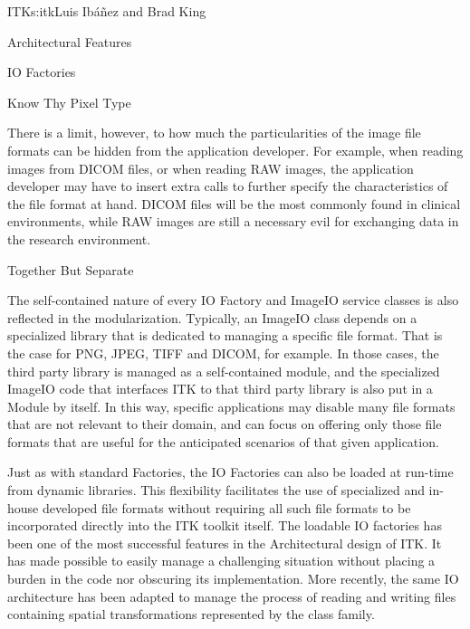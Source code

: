 \begin{aosachapter}{ITK}{s:itk}{Luis Ib\'{a}\~{n}ez and Brad King}
\begin{aosasect1}{Architectural Features}
\begin{aosasect2}{IO Factories}
\begin{aosasect3}{Know Thy Pixel Type}
\begin{aosaitemize}
\item {}
\item {}
\item {}
\item {}
\end{aosaitemize}

There is a limit, however, to how much the particularities of the image file
formats can be hidden from the application developer.  For example, when
reading images from DICOM files, or when reading RAW images, the application
developer may have to insert extra calls to further specify the characteristics
of the file format at hand. DICOM files will be the most commonly found in
clinical environments, while RAW images are still a necessary evil for
exchanging data in the research environment.

\end{aosasect3}

\begin{aosasect3}{Together But Separate}

The self-contained nature of every IO Factory and ImageIO service classes is
also reflected in the modularization. Typically, an ImageIO class depends on a
specialized library that is dedicated to managing a specific file format. That
is the case for PNG, JPEG, TIFF and DICOM, for example. In those cases, the
third party library is managed as a self-contained module, and the specialized
ImageIO code that interfaces ITK to that third party library is also put in a
Module by itself. In this way, specific applications may disable many
file formats that are not relevant to their domain, and can focus on offering
only those file formats that are useful for the anticipated scenarios of that
given application.

Just as with standard Factories, the IO Factories can also be loaded at
run-time from dynamic libraries. This flexibility facilitates the use of
specialized and in-house developed file formats without requiring all such file
formats to be incorporated directly into the ITK toolkit itself. The loadable
IO factories has been one of the most successful features in the Architectural
design of ITK. It has made possible to easily manage a challenging situation
without placing a burden in the code nor obscuring its implementation. More
recently, the same IO architecture has been adapted to manage the process of
reading and writing files containing spatial transformations represented by the
 class family.


\end{aosasect3}
\end{aosasect2}
\end{aosasect1}
\end{aosachapter}
